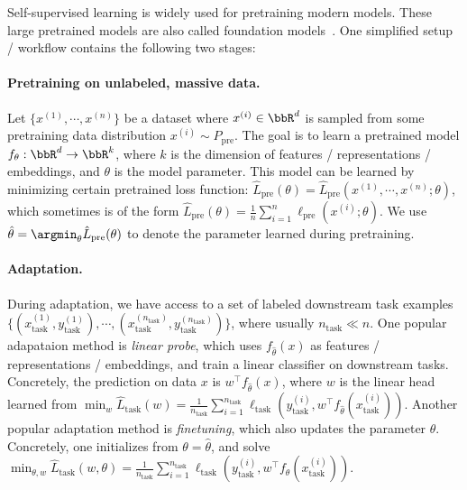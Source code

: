 
Self-supervised learning is widely used for pretraining modern models. These large pretrained models are also called foundation models~\cite{bommasani2021opportunities}. One simplified setup / workflow contains the following two stages:

\paragraph{Pretraining on unlabeled, massive data.} Let $\{x^{(1)}, \cdots, x^{(n)}\}$ be a dataset where $x^{(i)}\in\bbR^d$ is sampled from some pretraining data distribution $x^{(i)}\sim P_{\text{pre}}$. The goal is to learn a pretrained model $f_{\theta}: \bbR^d\rightarrow\bbR^k$, where $k$ is the dimension of features / representations / embeddings, and $\theta$ is the model parameter. This model can be learned by minimizing certain pretrained loss function: $\hat{L}_{\text{pre}}(\theta) = \hat{L}_{\text{pre}}(x^{(1)}, \cdots, x^{(n)}; \theta)$, which sometimes is of the form $\hat{L}_{\text{pre}}(\theta)  = \frac{1}{n}\sum_{i=1}^n \ell_{\text{pre}}(x^{(i)}; \theta)$. We use $\hat{\theta} = \argmin_{\theta}\hat{L}_{\text{pre}}(\theta)$ to denote the parameter learned during pretraining.

\paragraph{Adaptation.} During adaptation, we have access to a set of labeled downstream task examples $\{(x^{(1)}_{\text{task}}, y^{(1)}_{\text{task}}), \cdots, (x^{(n_{\text{task}})}_{\text{task}}, y^{(n_{\text{task}})}_{\text{task}})\}$, where usually $n_{\text{task}}\ll n$. One popular adapataion method is \emph{linear probe}, which uses $f_{\hat{\theta}}(x)$ as features / representations / embeddings, and train a linear classifier on downstream tasks. Concretely, the prediction on data $x$ is $w^\top f_{\hat{\theta}}(x)$, where $w$ is the linear head learned from $\min_{w} \hat{L}_{\text{task}}(w) = \frac{1}{n_{\text{task}}} \sum_{i=1}^{n_{\text{task}}} \ell_{\text{task}}(y^{(i)}_{\text{task}}, w^\top f_{\hat{\theta}}(x^{(i)}_{\text{task}}))$. Another popular adaptation method is \emph{finetuning}, which also updates the parameter $\theta$. Concretely, one initializes from $\theta = \hat{\theta}$, and solve $\min_{\theta, w} \hat{L}_{\text{task}}(w, \theta) = \frac{1}{n_{\text{task}}} \sum_{i=1}^{n_{\text{task}}} \ell_{\text{task}}(y^{(i)}_{\text{task}}, w^\top f_{{\theta}}(x^{(i)}_{\text{task}}))$.

